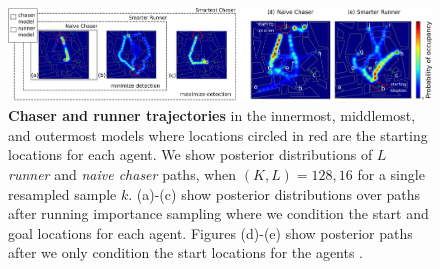 \documentclass[twoside]{article}
\begin{document}


\begin{figure}
\begin{center}
\centerline{\includegraphics[width=2.0\columnwidth]{occupancy_diagram.pdf}}
\caption{ \textbf{Chaser and runner trajectories} in the innermost, middlemost, and outermost models where locations circled in red are the starting locations for each agent. We show posterior distributions of $L$ \textit{runner} and \textit{naive chaser} paths, when $(K,L) = 128, 16$ for a single resampled sample $k$. (a)-(c) show posterior distributions over paths after running importance sampling where we condition the start and goal locations for each agent. Figures (d)-(e) show posterior paths after we only condition the start locations for the agents . %
}
\label{fig:progression}
\end{center}
\vspace{-1em}
\end{figure} 
\end{document}
